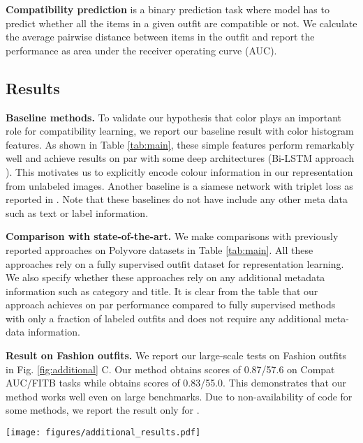 \documentclass[sigconf]{acmart}
\newcommand{\etal}{\textit{et al.}}
\begin{document}
\vspace{2mm}
\noindent \textbf{Compatibility prediction} is a binary prediction task where model has to predict whether all the items in a given outfit are compatible or not. We calculate the average pairwise distance between items in the outfit and report the performance as area under the receiver operating curve (\textsc{AUC}).

\subsection{Results}
\label{sec:results}
\noindent \textbf{Baseline methods.} To validate our hypothesis that color plays an important role for compatibility learning, we report our baseline result with color histogram features. As shown in Table \ref{tab:main}, these simple features perform remarkably well and achieve results on par with some deep architectures (Bi-LSTM approach \cite{bilstm}). This motivates us to explicitly encode colour information in our representation from unlabeled images. Another baseline is a siamese network with triplet loss as reported in \cite{eccv2018learning}. Note that these baselines do not have include any other meta data such as text or label information.

\vspace{1mm}

\noindent \textbf{Comparison with state-of-the-art.} We make comparisons with previously reported approaches on Polyvore datasets in Table \ref{tab:main}. All these approaches rely on a fully supervised outfit dataset for representation learning. We also specify whether these approaches rely on any additional metadata information such as category and title. It is clear from the table that our approach achieves on par performance compared to fully supervised methods with only a fraction of labeled outfits and does not require any additional meta-data information.

\noindent \textbf{Result on Fashion outfits.} We report our large-scale tests on Fashion outfits in Fig. \ref{fig:additional}{ C}. Our method obtains scores of 0.87/57.6 on Compat AUC/FITB tasks while \cite{eccv2018learning} obtains scores of 0.83/55.0. This demonstrates that our method works well even on large  benchmarks. Due to non-availability of code for some methods, we report the result only for \cite{eccv2018learning}.

\begin{figure*}[t]
    \centering
    \texttt{[image: figures/additional\_results.pdf]}
    \caption{\textbf{A.} Performance of our method with different proportion of training labels ($\alpha\%$) measured by Compatibility AUC on Polyvore dataset. \textbf{B.} Performance of our method with different unlabeled batch size $|\mathbf{b}_u|$ measured by Compatibility AUC on Polyvore dataset. See Sec. \ref{sec:ablations} \textbf{C.} Results of our method and Vasileva \etal  ~\cite{eccv2018learning} on Fashion Outfits dataset. See Sec. \ref{sec:ablations}.}
    \label{fig:additional}
\end{figure*}
\end{document}
